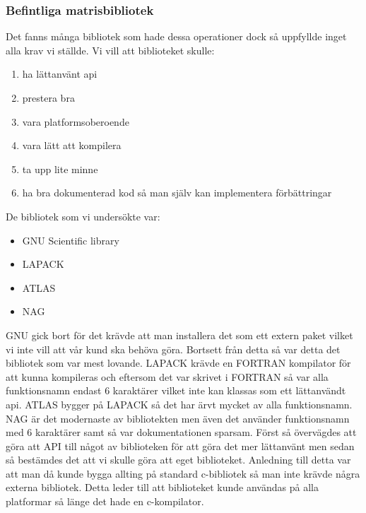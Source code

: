 \subsubsection{Befintliga matrisbibliotek}
Det fanns många bibliotek som hade dessa operationer dock så uppfyllde inget alla krav vi ställde. Vi vill att biblioteket skulle:
\begin{enumerate}
\item ha lättanvänt api
\item prestera bra
\item vara platformsoberoende
\item vara lätt att kompilera
\item ta upp lite minne
\item ha bra dokumenterad kod så man själv kan implementera förbättringar
\end{enumerate} 
De bibliotek som vi undersökte var:
\begin{itemize}

\item GNU Scientific library
\item LAPACK
\item ATLAS
\item NAG

\end{itemize}
GNU gick bort för det krävde att man installera det som ett extern paket vilket vi inte vill att vår kund ska behöva göra. Bortsett från detta så var detta det bibliotek som var mest lovande. 
LAPACK krävde en FORTRAN kompilator för att kunna kompileras och eftersom det var skrivet i FORTRAN så var alla funktionsnamn endast 6 karaktärer vilket inte kan klassas som ett lättanvändt api.
ATLAS bygger på LAPACK så det har ärvt mycket av alla funktionsnamn.
NAG är det modernaste av bibliotekten men även det använder funktionsnamn med 6 karaktärer samt så var dokumentationen sparsam. 
\newline
\newline
Först så övervägdes att göra att API till något av biblioteken för att göra det mer lättanvänt men sedan så bestämdes det att vi skulle göra att eget biblioteket. Anledning till detta var att man då kunde bygga allting på standard c-bibliotek så man inte krävde några externa bibliotek. Detta leder till att biblioteket kunde användas på alla platformar så länge det hade en c-kompilator. 


